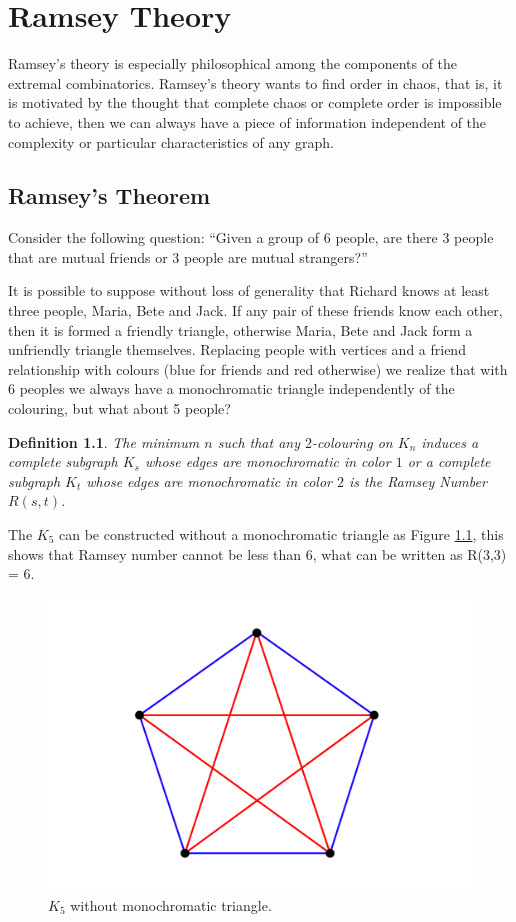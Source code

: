 \documentclass[12pt,twoside,a4paper]{book}
\numberwithin{equation}{section}
\newtheorem{definition}	[theorem] {Definition}
\theoremstyle{remark}
\begin{document}
\chapter{Ramsey Theory}

Ramsey's theory is especially philosophical among the components of the extremal combinatorics. Ramsey's theory wants to find order in chaos, that is, it is motivated by the thought that complete chaos or complete order is impossible to achieve, then we can always have a piece of information independent of the complexity or particular characteristics of any graph.

\section{Ramsey's Theorem}
Consider the following question:
``Given a group of 6 people, are there 3 people that are mutual friends or 3 people are mutual strangers?''

It is possible to suppose without loss of generality that Richard knows at least three people, Maria, Bete and Jack. If any pair of these friends know each other, then it is formed a friendly triangle, otherwise Maria, Bete and Jack form a unfriendly triangle themselves. Replacing people with vertices and a friend relationship with colours (blue for friends and red otherwise) we realize that with 6 peoples we always have a monochromatic triangle independently of the colouring, but what about 5 people?

\begin{definition}\label{def:RamseyNumbers} 
The minimum $n$ such that any $2$-colouring on $K_n$ induces a complete subgraph $K_s$ whose edges are monochromatic in color $1$ or a complete subgraph $K_t$ whose edges are monochromatic in color $2$ is the Ramsey Number $R(s,t)$.
\end{definition}

The $K_5$ can be constructed without a monochromatic triangle as Figure \ref{fig:K5}, this shows that Ramsey number cannot be less than 6, what can be written as  R(3,3) = 6.

\begin{figure}[H]
     \centering
     \includegraphics[scale=1]{Figuras/K5-sem-triangulo.jpg}
     \caption{$K_5$ without monochromatic triangle.}
     \label{fig:K5}
\end{figure}
\end{document}
